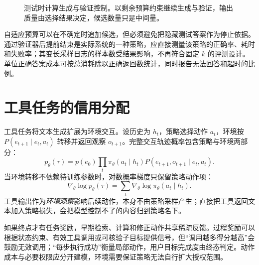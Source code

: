 \documentclass[../textbook.tex]{subfiles}
\begin{document}
\begin{figure}[htbp]
\centering
{}
\caption[测试时计算生成与验证控制]{测试时计算生成与验证控制。以剩余预算约束继续生成与验证，输出质量由选择结果决定，候选数量只是中间量。}\label{fig:reason-budget}
\end{figure}

自适应预算可以在不确定时追加候选，但必须避免把隐藏测试答案作为停止依据。通过验证器后提前结束是实际系统的一种策略，应直接测量该策略的正确率、耗时和失败率；其变长采样日志的样本数受结果影响，不再符合固定 $k$ 的评测设计。单位正确答案成本可按总消耗除以正确返回数统计，同时报告无法回答和超时的比例。

\section{工具任务的信用分配}
\optional
工具任务将文本生成扩展为环境交互。设历史为 $h_t$，策略选择动作 $a_t$，环境按 $P(e_{t+1}\mid e_t,a_t)$ 转移并返回观察 $o_{t+1}$。完整交互轨迹概率包含策略与环境两部分：
\begin{equation}
 p_\theta(\tau)=p(e_0)\prod_t
 \pi_\theta(a_t\mid h_t)P(e_{t+1},o_{t+1}\mid e_t,a_t).
\end{equation}
当环境转移不依赖待训练参数时，对数概率梯度只保留策略动作项：
\begin{equation}
 \nabla_\theta\log p_\theta(\tau)=\sum_t\nabla_\theta\log\pi_\theta(a_t\mid h_t).
\end{equation}
工具输出作为\emph{环境观察}影响后续动作，本身不由策略采样产生；直接把工具返回文本加入策略损失，会把模型控制不了的内容归到策略名下。

如果终点才有任务奖励，早期检索、计算和修正动作共享稀疏反馈。过程奖励可以根据状态约束、有效工具调用或可核验子目标提供信号，但“调用越多得分越高”会鼓励无效调用；“每步执行成功”衡量局部动作，用户目标完成度由终态判定。动作成本与必要权限应分开建模，环境需要保证策略无法自行扩大授权范围。
\end{document}
